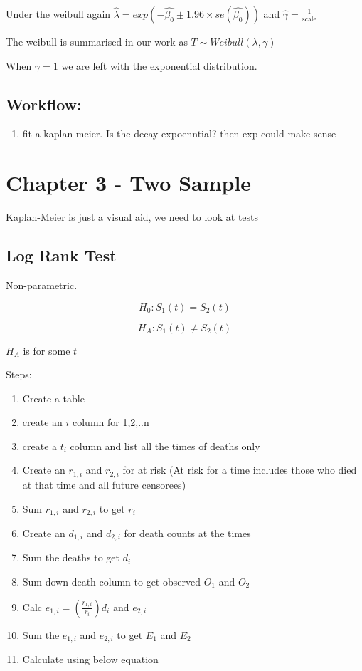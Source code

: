 \documentclass[
  letterpaper,
  DIV=11,
  numbers=noendperiod]{scrreprt}
\providecommand{\tightlist}{%
  \setlength{\itemsep}{0pt}\setlength{\parskip}{0pt}}\usepackage{longtable,booktabs,array}
\begin{document}
Under the weibull again
\(\hat{\lambda} = exp(-\hat{\beta_0} \pm 1.96\times se(\hat{\beta_0}))\)
and \(\hat{\gamma} = \frac{1}{\text{scale}}\)

The weibull is summarised in our work as
\(T \sim Weibull(\lambda, \gamma)\)

When \(\gamma = 1\) we are left with the exponential distribution.

\hypertarget{workflow-1}{%
\subsection{Workflow:}\label{workflow-1}}

\begin{enumerate}
\def\labelenumi{\arabic{enumi}.}
\tightlist
\item
  fit a kaplan-meier. Is the decay expoenntial? then exp could make
  sense
\end{enumerate}

\hypertarget{chapter-3---two-sample}{%
\section{Chapter 3 - Two Sample}\label{chapter-3---two-sample}}

Kaplan-Meier is just a visual aid, we need to look at tests

\hypertarget{log-rank-test}{%
\subsection{Log Rank Test}\label{log-rank-test}}

Non-parametric.

\[ H_0 : S_1(t) = S_2(t)\]

\[ H_A : S_1(t) \neq S_2(t)\]

\(H_A\) is for some \(t\)

Steps:

\begin{enumerate}
\def\labelenumi{\arabic{enumi})}
\tightlist
\item
  Create a table
\item
  create an \(i\) column for 1,2,..n
\item
  create a \(t_i\) column and list all the times of deaths only
\item
  Create an \(r_{1,i}\) and \(r_{2,i}\) for at risk (At risk for a time
  includes those who died at that time and all future censorees)
\item
  Sum \(r_{1,i}\) and \(r_{2,i}\) to get \(r_i\)
\item
  Create an \(d_{1,i}\) and \(d_{2,i}\) for death counts at the times
\item
  Sum the deaths to get \(d_i\)
\item
  Sum down death column to get observed \(O_1\) and \(O_2\)
\item
  Calc \(e_{1,i} = (\frac{r_{1,i}}{r_i})d_i\) and \(e_{2,i}\)
\item
  Sum the \(e_{1,i}\) and \(e_{2,i}\) to get \(E_1\) and \(E_2\)
\item
  Calculate using below equation
\end{enumerate}
\end{document}
